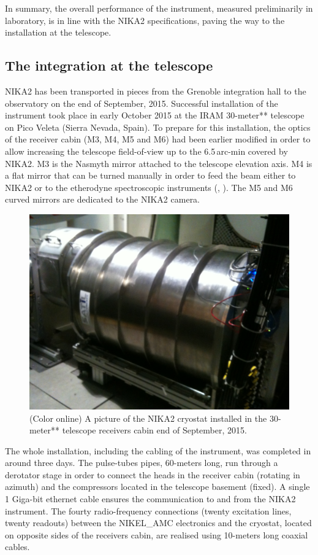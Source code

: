 \documentclass[]{aa} %
\begin{document}
In summary, the overall performance of the instrument, measured preliminarily in laboratory, is in line with the NIKA2 specifications, paving the way to the installation at the telescope. 

\subsection{The integration at the telescope}
\label{The integration at the telescope}

NIKA2 has been transported in pieces from the Grenoble integration hall to the
observatory on the end of September, 2015. Successful installation of the
instrument took place in early October 2015 at the IRAM 30-meter** telescope on
Pico Veleta (Sierra Nevada, Spain). To prepare for this installation, the optics
of the receiver cabin (M3, M4, M5 and M6) had been earlier modified in order to
allow increasing the telescope field-of-view up to the 6.5\,arc-min covered by
NIKA2. M3 is the Nasmyth mirror attached to the telescope elevation axis. M4 is
a flat mirror that can be turned manually in order to feed the beam either to
NIKA2 or to the etherodyne spectroscopic instruments (\cite{Carter2012},
\cite{Schuster2004}). The M5 and M6 curved mirrors are dedicated to the NIKA2
camera.

\begin{figure}[h]
   \centering
    \includegraphics[width=.85\linewidth]{NIKA2cryo.jpg}
      \caption{(Color online) A picture of the NIKA2 cryostat installed in the 30-meter** telescope receivers cabin end of September, 2015.}
         \label{Fig5}
\end{figure}

The whole installation, including the cabling of the instrument, was completed
in around three days. The pulse-tubes pipes, 60-meters long, run through a
derotator stage in order to connect the heads in the receiver cabin (rotating in
azimuth) and the compressors located in the telescope basement (fixed). A single
1 Giga-bit ethernet cable ensures the communication to and from the NIKA2
instrument. The fourty radio-frequency connections (twenty excitation lines,
twenty readouts) between the NIKEL\_AMC electronics and the cryostat, located on
opposite sides of the receivers cabin, are realised using 10-meters long coaxial
cables.
\end{document}
